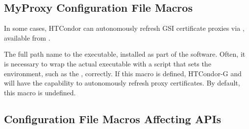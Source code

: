 \subsection{\label{sec:MyProxy-Config-File-Entries}MyProxy
Configuration File Macros}
 
In some cases, HTCondor can autonomously refresh GSI certificate proxies
via , available from
.

\begin{description}

\label{param:MyProxyGetDelegation}
\item[\Macro{MYPROXY\_GET\_DELEGATION}]
  The full path name to the
   executable, installed as part of the
   software.  Often, it is necessary to wrap the actual
  executable with a script that sets the environment, such as the
  , correctly.  If this macro is defined,
  HTCondor-G and  will have the capability to autonomously
  refresh proxy certificates.  By default, this macro is undefined.

\end{description}

\subsection{\label{sec:API-Config-File-Entries}
Configuration File Macros Affecting APIs}

